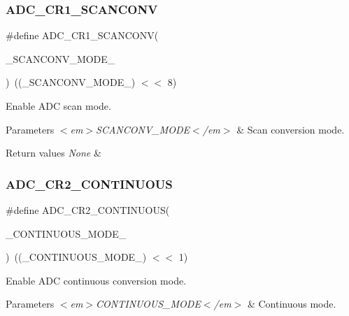 \subsubsection{\texorpdfstring{ADC\_CR1\_SCANCONV}{ADC\_CR1\_SCANCONV}}
{\footnotesize\ttfamily \#define A\+D\+C\+\_\+\+C\+R1\+\_\+\+S\+C\+A\+N\+C\+O\+NV(\begin{DoxyParamCaption}\item[{}]{\+\_\+\+S\+C\+A\+N\+C\+O\+N\+V\+\_\+\+M\+O\+D\+E\+\_\+ }\end{DoxyParamCaption})~((\+\_\+\+S\+C\+A\+N\+C\+O\+N\+V\+\_\+\+M\+O\+D\+E\+\_\+) $<$$<$ 8)}



Enable A\+DC scan mode. 


\begin{DoxyParams}{Parameters}
{\em $<$em$>$\+S\+C\+A\+N\+C\+O\+N\+V\+\_\+\+M\+O\+D\+E$<$/em$>$} & Scan conversion mode. \\
\hline
\end{DoxyParams}

\begin{DoxyRetVals}{Return values}
{\em None} & \\
\hline
\end{DoxyRetVals}
\mbox{\label{group___a_d_c___private___macros_gae92924f248b2fd7693ce648275a8087c}} 
\subsubsection{\texorpdfstring{ADC\_CR2\_CONTINUOUS}{ADC\_CR2\_CONTINUOUS}}
{\footnotesize\ttfamily \#define A\+D\+C\+\_\+\+C\+R2\+\_\+\+C\+O\+N\+T\+I\+N\+U\+O\+US(\begin{DoxyParamCaption}\item[{}]{\+\_\+\+C\+O\+N\+T\+I\+N\+U\+O\+U\+S\+\_\+\+M\+O\+D\+E\+\_\+ }\end{DoxyParamCaption})~((\+\_\+\+C\+O\+N\+T\+I\+N\+U\+O\+U\+S\+\_\+\+M\+O\+D\+E\+\_\+) $<$$<$ 1)}



Enable A\+DC continuous conversion mode. 


\begin{DoxyParams}{Parameters}
{\em $<$em$>$\+C\+O\+N\+T\+I\+N\+U\+O\+U\+S\+\_\+\+M\+O\+D\+E$<$/em$>$} & Continuous mode. \\
\hline
\end{DoxyParams}

